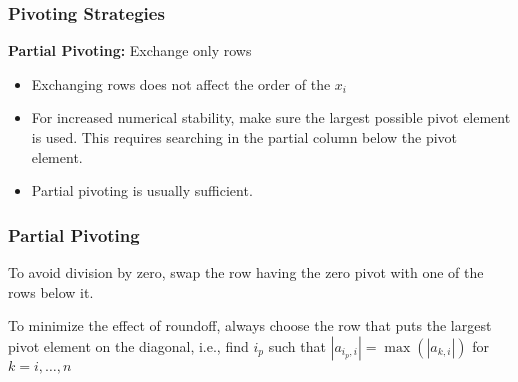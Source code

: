 \documentclass[10pt]{beamer}
\begin{document}
\begin{frame}
\frametitle{Pivoting Strategies}

\textbf{Partial Pivoting:} Exchange only rows
\begin{itemize}
    \item   Exchanging rows does not affect the order of the $x_i$
    \item   For increased numerical stability, make sure the
            largest possible pivot element is used.  This requires
            searching in the partial column below the pivot element.
    \item   Partial pivoting is usually sufficient.
\end{itemize}

\end{frame}
\begin{frame}
\frametitle{Partial Pivoting}

To avoid division by zero, swap the row having the zero
pivot with one of the rows below it.
\begin{center}
    \vspace{3ex}
    \vspace{3ex}
\end{center}

To minimize the effect of roundoff, always choose the row that puts the largest
pivot element on the diagonal, i.e., find $i_p$ such that
$|a_{i_p,i}|=\max(|a_{k,i}|)$ for $k=i,\ldots,n$

\end{frame}
\end{document}
